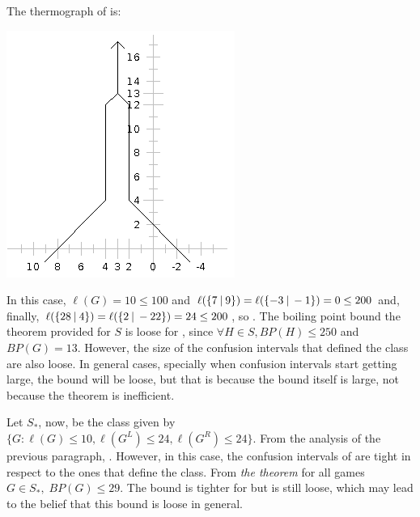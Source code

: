 \begin{center}
\end{center}

The thermograph of  is:
\begin{center}
	\includegraphics[scale=0.5]{../images/thermA.png}
\end{center}

In this case, $\ell(G) = 10 \leq 100$ and \mbox{$\ell(\mbox{$\{7\:|\:9\}$}) = \ell(\mbox{$\{-3\:|\:-1\}$}) = 0 \leq 200$} and, finally, \mbox{$\ell(\mbox{$\{28\:|\:4\}$}) = \ell(\mbox{$\{2\:|\:-22\}$}) = 24 \leq 200$}, so . The boiling point bound the theorem provided for $S$ is loose for \Gm{}, since $\forall H \in S, BP(H) \leq 250$ and $BP(G) = 13$. However, the size of the confusion intervals that defined the class are also loose. In general cases, specially when confusion intervals start getting large, the bound will be loose, but that is because the bound itself is large, not because the theorem is inefficient.

Let $S_*$, now, be the class given by $\{G : \ell(G)\leq10, \ell(G^L)\leq24, \ell(G^R)\leq24\}$. From the analysis of the previous paragraph, . However, in this case, the confusion intervals of \Gm{} are tight in respect to the ones that define the class. From \textit{the theorem} for all games $G \in S_*,\; BP(G) \leq 29$. The bound is tighter for \Gm{} but is still loose, which may lead to the belief that this bound is loose in general.

